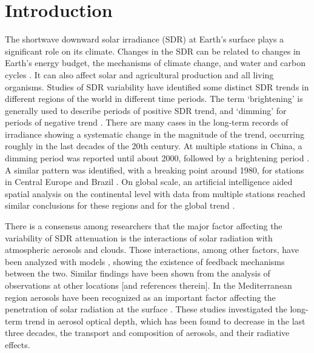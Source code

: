 \documentclass[applsci,article,submit,moreauthors,pdftex]{Definitions/mdpi}
\begin{document}

\hypertarget{introduction}{%
\section{Introduction}\label{introduction}}

The shortwave downward solar irradiance (SDR) at Earth's surface plays a
significant role on its climate. Changes in the SDR can be related to
changes in Earth's energy budget, the mechanisms of climate change, and
water and carbon cycles \citep{Wild2009}. It can also affect solar and
agricultural production and all living organisms. Studies of SDR
variability have identified some distinct SDR trends in different
regions of the world in different time periods. The term `brightening'
is generally used to describe periods of positive SDR trend, and
`dimming' for periods of negative trend \citep{Wild2009}. There are many
cases in the long-term records of irradiance showing a systematic change
in the magnitude of the trend, occurring roughly in the last decades of
the 20th century. At multiple stations in China, a dimming period was
reported until about 2000, followed by a brightening period
\citep{Yang2021}. A similar pattern was identified, with a breaking
point around 1980, for stations in Central Europe \citep{Wild2021} and
Brazil \citep{Yamasoe2021}. On global scale, an artificial intelligence
aided spatial analysis on the continental level with data from multiple
stations reached similar conclusions for these regions and for the
global trend \citep{Yuan2021}.

There is a consensus among researchers that the major factor affecting
the variability of SDR attenuation is the interactions of solar
radiation with atmospheric aerosols and clouds. Those interactions,
among other factors, have been analyzed with models
\citep{Li2016, Samset2018}, showing the existence of feedback mechanisms
between the two. Similar findings have been shown from the analysis of
observations at other locations
\citep{Schwarz2020, Ohvril2009, Zerefos2009, Xia2007} {[}and references
therein{]}. In the Mediterranean region aerosols have been recognized as
an important factor affecting the penetration of solar radiation at the
surface \citep{Fountoulakis2016, Siomos2018, Gkikas2013, Lozano2021}.
These studies investigated the long-term trend in aerosol optical depth,
which has been found to decrease in the last three decades, the
transport and composition of aerosols, and their radiative effects.
\end{document}
